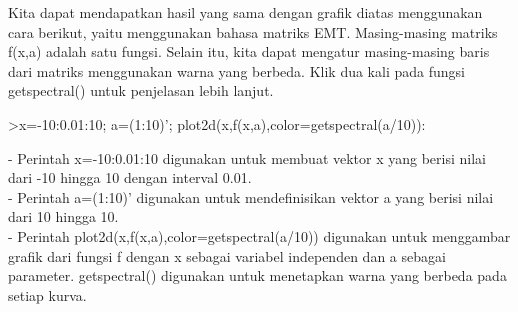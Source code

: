 \documentclass[a4paper,10pt]{article}
\begin{document}
\begin{eulernotebook}
\begin{eulercomment}
\begin{eulercomment}
\begin{eulercomment}
\begin{eulercomment}
\begin{eulercomment}
Kita dapat mendapatkan hasil yang sama dengan grafik diatas
menggunakan cara berikut, yaitu menggunakan bahasa matriks EMT.
Masing-masing matriks f(x,a) adalah satu fungsi. Selain itu, kita
dapat mengatur masing-masing baris dari matriks menggunakan warna yang
berbeda. Klik dua kali pada fungsi getspectral() untuk penjelasan
lebih lanjut.
\end{eulercomment}
\begin{eulerprompt}
>x=-10:0.01:10; a=(1:10)'; plot2d(x,f(x,a),color=getspectral(a/10)):
\end{eulerprompt}
\begin{eulercomment}
- Perintah x=-10:0.01:10 digunakan untuk membuat vektor x yang berisi
nilai dari -10 hingga 10 dengan interval 0.01.\\
- Perintah a=(1:10)' digunakan untuk mendefinisikan vektor a yang
berisi nilai dari 10 hingga 10.\\
- Perintah plot2d(x,f(x,a),color=getspectral(a/10)) digunakan untuk
menggambar grafik dari fungsi f dengan x sebagai variabel independen
dan a sebagai parameter. getspectral() digunakan untuk menetapkan
warna yang berbeda pada setiap kurva.


\end{eulercomment}
\end{eulercomment}
\end{eulercomment}
\end{eulercomment}
\end{eulercomment}
\end{eulernotebook}
\end{document}

